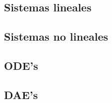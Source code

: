 \subsection{Sistemas lineales}
\subsection{Sistemas no lineales}
\subsection{ODE's}
\subsection{DAE's}
